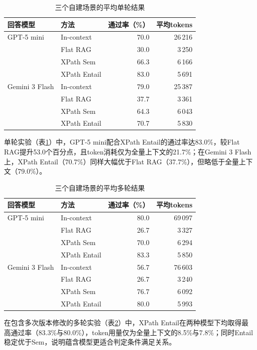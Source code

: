 \begin{table}[H]
\centering
\caption{三个自建场景的平均单轮结果}
\label{tab:sxpath-single}
\begin{tabular}{@{}llrr@{}}
\toprule
回答模型 & 方法 & 通过率（\%） & 平均tokens \\
\midrule
GPT-5 mini & In-context & 70.0 & 26\,216 \\
 & Flat RAG & 30.0 & 3\,250 \\
 & XPath Sem & 66.3 & 6\,166 \\
 & XPath Entail & 83.0 & 5\,691 \\
\midrule
Gemini 3 Flash & In-context & 79.0 & 25\,387 \\
 & Flat RAG & 37.7 & 3\,361 \\
 & XPath Sem & 64.3 & 6\,043 \\
 & XPath Entail & 70.7 & 5\,830 \\
\bottomrule
\end{tabular}
\end{table}

单轮实验（表\ref{tab:sxpath-single}）中，GPT-5 mini配合XPath Entail的通过率达83.0\%，较Flat RAG提升53.0个百分点，且token消耗仅为全量上下文的21.7\%；在Gemini 3 Flash上，XPath Entail（70.7\%）同样大幅优于Flat RAG（37.7\%），但略低于全量上下文（79.0\%）。

\begin{table}[H]
\centering
\caption{三个自建场景的平均多轮结果}
\label{tab:sxpath-multi}
\begin{tabular}{@{}llrr@{}}
\toprule
回答模型 & 方法 & 通过率（\%） & 平均tokens \\
\midrule
GPT-5 mini & In-context & 80.0 & 69\,097 \\
 & Flat RAG & 26.7 & 3\,327 \\
 & XPath Sem & 70.0 & 6\,294 \\
 & XPath Entail & 83.3 & 5\,850 \\
\midrule
Gemini 3 Flash & In-context & 56.7 & 76\,603 \\
 & Flat RAG & 26.7 & 3\,240 \\
 & XPath Sem & 76.7 & 6\,092 \\
 & XPath Entail & 80.0 & 5\,993 \\
\bottomrule
\end{tabular}
\end{table}

在包含多次版本修改的多轮实验（表\ref{tab:sxpath-multi}）中，XPath Entail在两种模型下均取得最高通过率（83.3\%与80.0\%），token用量仅为全量上下文的8.5\%与7.8\%；同时Entail稳定优于Sem，说明蕴含模型更适合判定条件满足关系。

